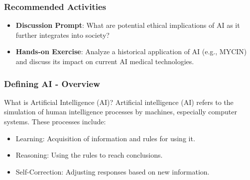 \documentclass[aspectratio=169]{beamer}
\begin{document}
\begin{frame}[fragile]
    \frametitle{Recommended Activities}
    \begin{itemize}
        \item \textbf{Discussion Prompt}: What are potential ethical implications of AI as it further integrates into society?
        \item \textbf{Hands-on Exercise}: Analyze a historical application of AI (e.g., MYCIN) and discuss its impact on current AI medical technologies.
    \end{itemize}
\end{frame}

\begin{frame}[fragile]
    \frametitle{Defining AI - Overview}
    \begin{block}{What is Artificial Intelligence (AI)?}
        Artificial intelligence (AI) refers to the simulation of human intelligence processes by machines, especially computer systems.
        These processes include:
        \begin{itemize}
            \item Learning: Acquisition of information and rules for using it.
            \item Reasoning: Using the rules to reach conclusions.
            \item Self-Correction: Adjusting responses based on new information.
        \end{itemize}
    \end{block}
\end{frame}
\end{document}
